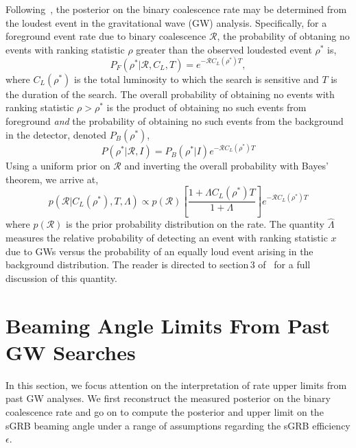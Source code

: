 \documentclass[twocolumn,nofootinbib]{revtex4-1}
\newcommand{\cbcrate}{{{\mathcal R}}}
\newcommand{\rhostar}{{\rho^*}}
\def\gw#1{gravitational wave#1 (GW#1)\gdef\gw{GW}}
\begin{document}
Following~\cite{Biswas09,BradyFairhurst08}, the posterior on the binary
coalescence rate may be determined from the loudest event in the \gw{}
analysis.  Specifically, for a foreground event rate due to  binary coalescence
$\cbcrate$, the probability of obtaning no events with ranking statistic $\rho$
greater than the observed loudested event $\rhostar$ is,
%
\begin{equation}
P_F(\rhostar | \cbcrate, C_L, T) = e^{-\cbcrate C_L(\rhostar) T},
\end{equation}
%
where $C_L(\rhostar)$ is the total luminosity to which the search is sensitive
and $T$ is the duration of the search.  The overall probability of obtaining
no events with ranking statistic $\rho>\rhostar$ is the product of obtaining
no such events from foreground \emph{and} the probability of obtaining no such
events from the background in the detector, denoted $P_B(\rhostar)$,
%
\begin{equation}
P(\rhostar|\cbcrate,I) = P_B(\rhostar|I)e^{-\cbcrate C_L(\rhostar) T}
\end{equation}
%
Using a uniform prior on $\cbcrate$ and inverting the overall probability with
Bayes' theorem, we arrive at,
%
\begin{equation}\label{eq:loudestEventPosterior}
p(\cbcrate | C_L({\rhostar}), T, \Lambda) \propto p(\cbcrate) \left[ \frac{1+\Lambda
C_L(\rhostar) T}{1+\Lambda}\right] e^{-\cbcrate C_L(\rhostar) T}
\end{equation}
%
where $p(\cbcrate)$ is the prior probability distribution on the rate.  The
quantity $\hat{\Lambda}$ measures the relative probability of detecting an event
with ranking statistic $x$ due to \gw{s} versus the probability of an equally loud
event arising in the background distribution.  The reader is directed to
section\,3 of~\cite{BradyFairhurst08} for a full discussion of this quantity.


\section{Beaming Angle Limits From Past GW Searches}

In this section, we focus attention on the interpretation of rate upper limits
from past \gw{} analyses.  We first reconstruct the measured posterior on the
binary coalescence rate and go on to compute the posterior and upper limit on
the sGRB beaming angle under a range of assumptions regarding the sGRB
efficiency $\epsilon$.
\end{document}
